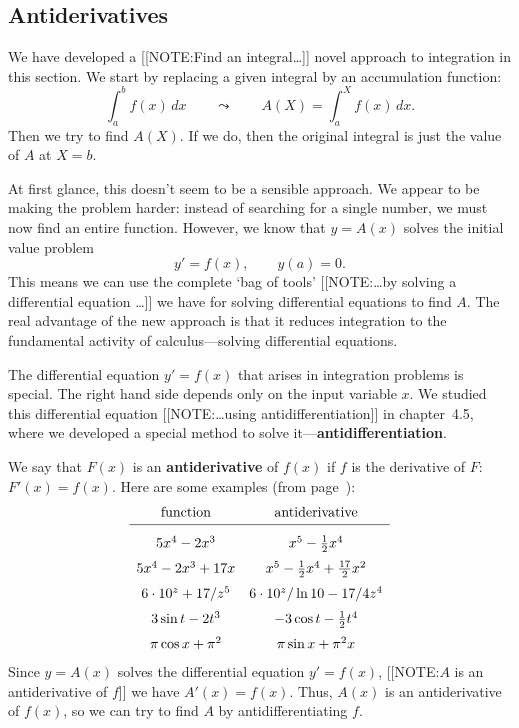 \subsection{Antiderivatives}
\label{subsec:antiderivatives}

We have developed a 
[[NOTE:Find an integral\ldots]]
novel approach to integration in this section.  We start by replacing
a given integral by an accumulation function:
\[
\int_a^b f(x) \, dx \qquad \leadsto \qquad
		A(X) = \int_a^X f(x) \, dx.
\]
Then we try to find $A(X)$.  If we do, then the original integral is
just the value of $A$ at $X = b$.

At first glance, this doesn't seem to be a sensible approach.  We
appear to be making the problem harder: instead of searching for a
single number, we must now find an entire function.  However, we know
that $y =A(x)$ solves the initial value problem
\[
y' = f(x), \qquad y(a) = 0.
\]
This means we can use the complete `bag of tools' 
[[NOTE:\ldots by solving  a differential  equation \ldots]]
we have for solving differential equations to find $A$.  The real
advantage of the new approach is that it reduces integration to the
fundamental activity of calculus---solving differential equations.

The differential equation $y' = f(x)$ that arises in integration
problems is special.  The right hand side depends only on the input
variable $x$.  We studied this differential equation
[[NOTE:\ldots using antidifferentiation]]
in chapter~4.5, where we developed a special method to solve
it---{\bf antidifferentiation}.

We say that $F(x)$ is an {\bf antiderivative} of $f(x)$ if $f$ is the
derivative of $F$: $F'(x) = f(x)$.  Here are some examples (from
page~\pageref{antideriv table}): \addtolength{\arraycolsep}{8pt}
	\[
\begin{array}{cc}
	\mbox{function} & \mbox{antiderivative} \\[2pt] \hline
	\rule{0pt}{16pt} 5x^4 - 2x^3\rule{0pt}{16pt} & 
		x^5 - \tfrac{1}{2} x^4 \\[6pt]
	5x^4 - 2x^3 + 17x & 
		x^5 - \tfrac{1}{2} x^4 + \tfrac{17}{2} x^2 \\[6pt]
	6 \cdot 10^z + 17/z^5 & 
		 6 \cdot 10^z/\ln{10} -  17/4z^4 \\[6pt]
	3\sin{t} - 2t^3 & -3\cos{t} - \tfrac{1}{2} t^4 \\[6pt]
	\pi\cos{x} + \pi^2 & \pi\sin{x} + \pi^2 x 
	\end{array}
\]
\addtolength{\arraycolsep}{-8pt}%
Since $y = A(x)$ solves the differential equation $y' = f(x)$, 
	[[NOTE:$A$ is an antiderivative  of $f$]]
we have $A'(x) = f(x)$.  Thus, $A(x)$ is an antiderivative of $f(x)$, so we can try to find $A$ by antidifferentiating $f$.

